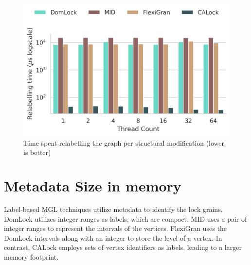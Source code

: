

\begin{figure}[ht]
	\captionsetup{justification=centering}
	\centering
		\includegraphics[width=.7\columnwidth]{figures/PerformanceCharts/ReadWithModificationsRelabelling}
	\caption{Time spent relabelling the graph per structural modification (lower is better)}
	\label{relabellingTime}
\end{figure}


\section{Metadata Size in memory} \label{benchmark:metadatasize}


Label-based MGL techniques utilize metadata to identify the lock grains.
DomLock utilizes integer ranges as labels, which are compact. 
MID uses a pair of integer ranges to represent the intervals of the vertices.
FlexiGran uses the DomLock intervals along with an integer to store the level of a vertex.
In contrast, CALock employs sets of vertex identifiers as labels, leading to a larger memory footprint.

